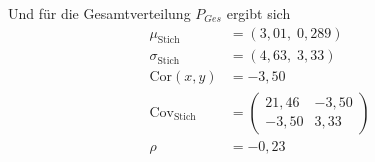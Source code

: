Und für die Gesamtverteilung $P_{Ges}$ ergibt sich
\begin{align}
  \mu_{\text{Stich}}         &=\left(3,01,\;  0,289\right)\\
  \sigma_{\text{Stich}}      &=\left(4,63,\;  3,33\right)\\
  \text{Cor}(x,y)            &=-3,50\\
  \text{Cov}_{\text{Stich}}  &=\left(
  \begin{array}{rr}
    21,46   & -3,50\\
    -3,50   & 3,33
  \end{array}
                            \right)\\
  \rho                       &=-0,23
\end{align}

